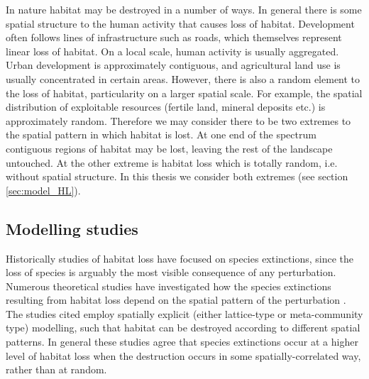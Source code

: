 In nature habitat may be destroyed in a number of ways. In general there is some spatial structure to the human activity that causes loss of habitat. Development often follows lines of infrastructure such as roads, which themselves represent linear loss of habitat. On a local scale, human activity is usually aggregated. Urban development is approximately contiguous, and agricultural land use is usually concentrated in certain areas. However, there is also a random element to the loss of habitat, particularity on a larger spatial scale. For example, the spatial distribution of exploitable resources (fertile land, mineral deposits etc.) is approximately random. Therefore we may consider there to be two extremes to the spatial pattern in which habitat is lost. At one end of the spectrum contiguous regions of habitat may be lost, leaving the rest of the landscape untouched. At the other extreme is habitat loss which is totally random, i.e. without spatial structure. In this thesis we consider both extremes (see section \ref{sec:model_HL}).



\subsection{Modelling studies}
\label{sec:intro_modelling_HL}

Historically studies of habitat loss have focused on species extinctions, since the loss of species is arguably the most visible consequence of any perturbation. Numerous theoretical studies have investigated how the species extinctions resulting from habitat loss depend on the spatial pattern of the perturbation \cite{allen2007self,jager2006simulated,dytham1995effect,
hill1999habitat,travis2003climate,with1999extinction,ovaskainen2002metapopulation}. The studies cited employ spatially explicit (either lattice-type or meta-community type) modelling, such that habitat can be destroyed according to different spatial patterns. In general these studies agree that species extinctions occur at a higher level of habitat loss when the destruction occurs in some spatially-correlated way, rather than at random. 

